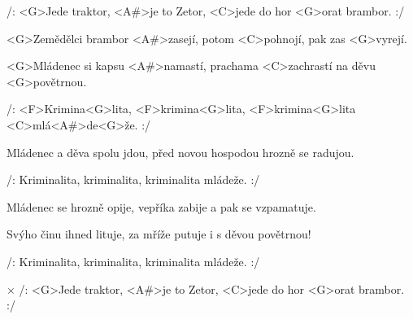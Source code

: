 

\zr
/: <G>Jede traktor, <A#>je to Zetor,
<C>jede do hor <G>orat brambor. :/
\kr

\zs
<G>Zemědělci brambor <A#>zasejí, potom <C>pohnojí, pak zas <G>vyrejí.

<G>Mládenec si kapsu <A#>namastí, prachama <C>zachrastí na děvu <G>povětrnou.

/: <F>Krimina<G>lita, <F>krimina<G>lita, <F>krimina<G>lita <C>mlá<A#>de<G>že. :/
\ks

\zs
Mládenec a děva spolu jdou, před novou hospodou hrozně se radujou.


/: Kriminalita, kriminalita, kriminalita mládeže. :/
\ks

\zs
Mládenec se hrozně opije, vepříka zabije a pak se vzpamatuje.

Svýho činu ihned lituje, za mříže putuje i s děvou povětrnou!

/: Kriminalita, kriminalita, kriminalita mládeže. :/
\ks

× /: <G>Jede traktor, <A#>je to Zetor, <C>jede do hor <G>orat brambor. :/
\kr

\kp
